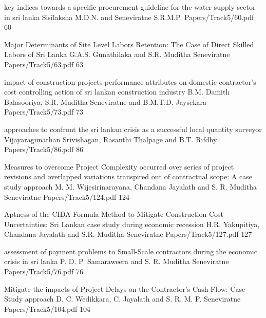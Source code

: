 

         \addpaper
    	{key indices towards a specific procurement guideline for the water supply sector in sri lanka}
   		 {Sisilaksha M.D.N. and Seneviratne S.R.M.P.} 
   		 {Papers/Track5/60.pdf}
        {60}

        \addpaper
    	{Major Determinants of Site Level Labors Retention: The Case of Direct Skilled Labors of Sri Lanka}
   		 {G.A.S. Gunathilaka and S.R. Muditha Seneviratne} 
   		 {Papers/Track5/63.pdf}
        {63}

        \addpaper
    	{impact of construction projects performance attributes on domestic contractor’s cost controlling action of sri lankan construction industry}
   		 {B.M. Damith Balasooriya, S.R. Muditha Seneviratne and B.M.T.D. Jaysekara} 
   		 {Papers/Track5/73.pdf}
        {73}

        \addpaper
    	{approaches to confront the sri lankan crisis as a successful local quantity surveyor}
   		 {Vijayaragunathan Srivishagan, Rasanthi Thalpage and B.T. Rifdhy} 
   		 {Papers/Track5/86.pdf}
        {86}


           \addpaper
    	{Measures to overcome Project Complexity occurred over series of project revisions and overlapped variations transpired out of contractual scope: A case study approach}
   		 {M. M. Wijesirinarayana, Chandana Jayalath and S. R. Muditha Seneviratne} 
   		 {Papers/Track5/124.pdf}
        {124}


        
        \addpaper
    	{Aptness of the CIDA Formula Method to Mitigate Construction Cost Uncertainties: Sri Lankan case study during economic recession}
   		 {H.R. Yakupitiya, Chandana Jayalath and S.R. Muditha Seneviratne} 
   		 {Papers/Track5/127.pdf}
        {127}



        
         \addpaper
    	{assessment of payment problems to Small-Scale contractors during the economic crisis in sri lanka}
   		 {P. D. P. Samaraweera and S. R. Muditha Seneviratne} 
   		 {Papers/Track5/76.pdf}
        {76}


    
        \addpaper
    	{Mitigate the impacts of Project Delays on the Contractor’s Cash Flow: Case Study approach}
   		 {D. C. Wedikkara, C. Jayalath and S. R. M. P. Seneviratne} 
   		 {Papers/Track5/104.pdf}
        {104}
        
     

